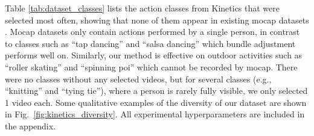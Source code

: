 \documentclass[10pt,twocolumn,letterpaper]{article}
\begin{document}
\begin{table}[tb]
\caption{The most common action classes of the videos selected from Kinetics.
Our bundle adjustment method works well on action classes that do not appear in motion capture datasets, e.g., those that occur outdoors or contain multiple people. }
\centering
{}
\label{tab:dataset_classes}
\vspace{-\baselineskip}
\end{table} 
Table \ref{tab:dataset_classes} lists the action classes from Kinetics that were selected most often, showing that none of them appear in existing mocap datasets \cite{ionescu_pami_2014, sigal_ijcv_2010, mehta_3dv_2017}.
Mocap datasets only contain actions performed by a single person, in contrast to classes such as ``tap dancing'' and ``salsa dancing'' which bundle adjustment performs well on.
Similarly, our method is effective on outdoor activities such as ``roller skating'' and ``spinning poi'' which cannot be recorded by mocap.
There were no classes without any selected videos, but for several classes (e.g., ``knitting'' and ``tying tie''), where a person is rarely fully visible, we only selected 1 video each.
Some qualitative examples of the diversity of our dataset are shown in Fig.~\ref{fig:kinetics_diversity}.
All experimental hyperparameters are included in the appendix.
\end{document}
